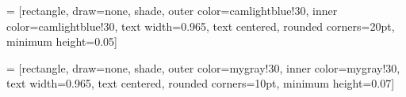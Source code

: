 \newcommand{\mysection}[1]
{
\begin{center}
  \begin{tikzpicture}
    \node[mysection] {\sffamily\bfseries\LARGE#1};
  \end{tikzpicture}
\end{center}
}

 = [rectangle,
      draw=none,
      shade,
      outer color=camlightblue!30,
      inner color=camlightblue!30,
      text width=0.965\columnwidth,
      text centered,
      rounded corners=20pt,
      minimum height=0.05\columnwidth]

\newcommand{\mysectionv}[1]
{
\begin{center}
  \begin{tikzpicture}
    \node[mysectionv] {\sffamily\bfseries\LARGE#1};
  \end{tikzpicture}
\end{center}
}

 = [rectangle,
      draw=none,
      shade,
      outer color=mygray!30,
      inner color=mygray!30,
      text width=0.965\columnwidth,
      text centered,
      rounded corners=10pt,
      minimum height=0.07\columnwidth]

\newcommand{\mysectiong}[1]
{
\begin{center}
  \begin{tikzpicture}
    \node[mysectiong] {\sffamily\bfseries\LARGE#1};
  \end{tikzpicture}
\end{center}
}


%
%
%

\renewcommand{\familydefault}{cmss}
\sffamily


\newcommand{\background}[3]{
}





